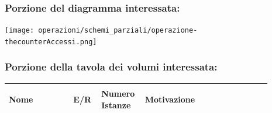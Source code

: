 \documentclass[12pt,a4paper]{article}
\begin{document}
\subsubsection*{Porzione del diagramma interessata:}



\texttt{[image: operazioni/schemi\_parziali/operazione-\\thecounterAccessi.png]} 



\subsubsection*{Porzione della tavola dei volumi interessata:}



\begin{center}\setlength{\extrarowheight}{1.5pt}\begin{longtable}{|p{0.23\linewidth}|p{0.1\linewidth}|p{0.11\linewidth}|p{0.45\linewidth}|}



\hline \textbf{Nome}   & \begin{center}\vspace{-15pt}\textbf{E/R}\end{center} & \textbf{Numero Istanze} & \textbf{Motivazione}\\ 



\hline



\end{longtable}\end{center}
\end{document}
